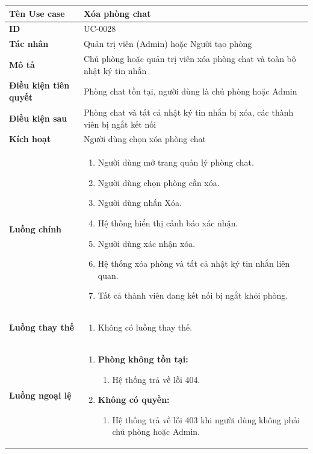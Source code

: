 {
\small
\renewcommand{\arraystretch}{1.15}

\begin{tabularx}{\textwidth}{|>{\raggedright\arraybackslash}p{3.5cm}|>{\raggedright\arraybackslash}X|}
\hline
\textbf{Tên Use case} & Xóa phòng chat \\
\hline
\textbf{ID} & UC-0028 \\
\hline
\textbf{Tác nhân} & Quản trị viên (Admin) hoặc Người tạo phòng \\
\hline
\textbf{Mô tả} & Chủ phòng hoặc quản trị viên xóa phòng chat và toàn bộ nhật ký tin nhắn \\
\hline
\textbf{Điều kiện tiên quyết} & Phòng chat tồn tại, người dùng là chủ phòng hoặc Admin \\
\hline
\textbf{Điều kiện sau} & Phòng chat và tất cả nhật ký tin nhắn bị xóa, các thành viên bị ngắt kết nối \\
\hline
\textbf{Kích hoạt} & Người dùng chọn xóa phòng chat \\
\hline
\textbf{Luồng chính} &
\begin{enumerate}
    \item Người dùng mở trang quản lý phòng chat.
    \item Người dùng chọn phòng cần xóa.
    \item Người dùng nhấn Xóa.
    \item Hệ thống hiển thị cảnh báo xác nhận.
    \item Người dùng xác nhận xóa.
    \item Hệ thống xóa phòng và tất cả nhật ký tin nhắn liên quan.
    \item Tất cả thành viên đang kết nối bị ngắt khỏi phòng.
\end{enumerate} \\
\hline
\textbf{Luồng thay thế} &
\begin{enumerate}
    \item Không có luồng thay thế.
\end{enumerate} \\
\hline
\textbf{Luồng ngoại lệ} &
\begin{enumerate}
    \item \textbf{Phòng không tồn tại:}
    \begin{enumerate}
        \item[2Err.] Hệ thống trả về lỗi 404.
    \end{enumerate}
    \item \textbf{Không có quyền:}
    \begin{enumerate}
        \item[2Err2.] Hệ thống trả về lỗi 403 khi người dùng không phải chủ phòng hoặc Admin.
    \end{enumerate}
\end{enumerate} \\
\hline
\end{tabularx}
}

